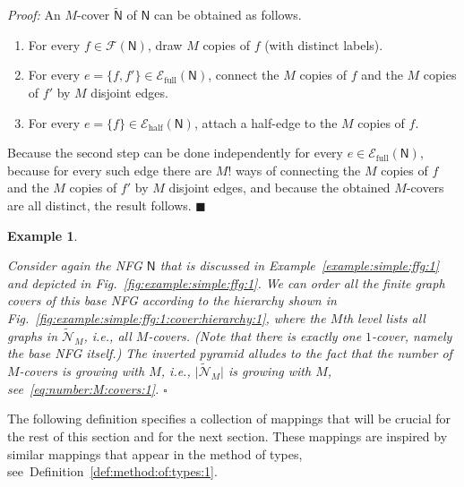 \documentclass[journal, twocolumn]{IEEEtran}
\newcommand{\ie}{\emph{i.e.}}
\newcommand{\set}[1]{\mathcal{#1}}
\newcommand{\graph}[1]{\mathsf{#1}}
\newcommand{\setEfull}{\set{E}_{\mathrm{full}}}
\newcommand{\setEhalf}{\set{E}_{\mathrm{half}}}
\newcommand{\setF}{\set{F}}
\newcommand{\graphN}{\graph{N}}
\newcommand{\cover}[1]{\tilde{#1}}
\newcommand{\cset}[1]{\cover{\set{#1}}}
\newcommand{\cgraph}[1]{\cover{\graph{#1}}}
\newcommand{\cardbig}[1]{\big\lvert #1 \big\rvert}
\newcommand{\?}{\mathrm{?}}
\newcommand{\qedblack}{\hspace*{\fill}%
  $\blacksquare$\smallskip}
\newcommand{\qedwhite}{\hspace*{\fill}%
  $\square$\smallskip}
\newcommand{\exampleend}{\qedwhite}
\newtheorem{Example}[Lemma]{Example}
\newenvironment{Proof}%
  {\noindent \emph{Proof:}}{\qedblack}
\begin{document}
\begin{Proof}
  An $M$-cover $\cgraph{N}$ of $\graphN$ can be obtained as follows.
  \begin{enumerate}

  \item For every $f \in \setF(\graphN)$, draw $M$ copies of $f$ (with
    distinct labels).

  \item For every $e = \{ f, f' \} \in \setEfull(\graphN)$, connect the $M$
    copies of $f$ and the $M$ copies of $f'$ by $M$ disjoint edges.

  \item For every $e = \{ f \} \in \setEhalf(\graphN)$, attach a half-edge to
    the $M$ copies of $f$.

  \end{enumerate}
  Because the second step can be done independently for every $e \in
  \setEfull(\graphN)$, because for every such edge there are $M!$ ways of
  connecting the $M$ copies of $f$ and the $M$ copies of $f'$ by $M$ disjoint
  edges, and because the obtained $M$-covers are all distinct, the result
  follows.
\end{Proof}


\begin{Example}
  \label{example:simple:ffg:1:cont:2}

  Consider again the NFG $\graphN$ that is discussed in
  Example~\ref{example:simple:ffg:1} and depicted in
  Fig.~\ref{fig:example:simple:ffg:1}. We can order all the finite graph
  covers of this base NFG according to the hierarchy shown in
  Fig.~\ref{fig:example:simple:ffg:1:cover:hierarchy:1}, where the $M$th
  level lists all graphs in $\cset{N}_M$, \ie, all $M$-covers. (Note that
  there is exactly one $1$-cover, namely the base NFG itself.)  The inverted
  pyramid alludes to the fact that the number of $M$-covers is growing with
  $M$, \ie, $\cardbig{\cset{N}_M}$ is growing with $M$,
  see~\eqref{eq:number:M:covers:1}.  \exampleend
\end{Example}


The following definition specifies a collection of mappings that will be
crucial for the rest of this section and for the next section. These mappings
are inspired by similar mappings that appear in the method of types,
see~Definition~\ref{def:method:of:types:1}.
\end{document}
